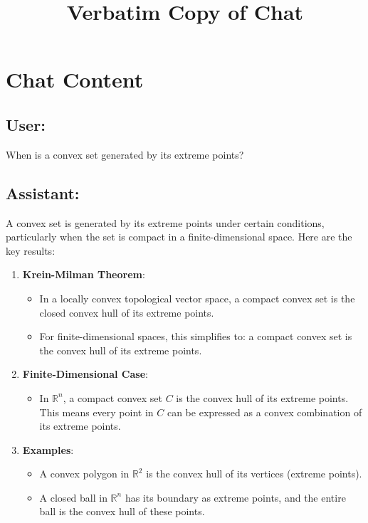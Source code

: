 \documentclass{article}
\begin{document}
\title{Verbatim Copy of Chat}
\author{}
\date{}
\maketitle

\section*{Chat Content}

\subsection*{User:}

When is a convex set generated by its extreme points?

\subsection*{Assistant:}

A convex set is generated by its extreme points under certain conditions,
particularly when the set is compact in a finite-dimensional space. Here are
the key results:

\begin{enumerate}
\item \textbf{Krein-Milman Theorem}: 

\begin{itemize}
\item In a locally convex topological vector space, a compact convex set is
the closed convex hull of its extreme points. 

\item For finite-dimensional spaces, this simplifies to: a compact convex
set is the convex hull of its extreme points. 
\end{itemize}

\item \textbf{Finite-Dimensional Case}: 

\begin{itemize}
\item In $\mathbb{R}^n$, a compact convex set $C$ is the convex hull of its
extreme points. This means every point in $C$ can be expressed as a convex
combination of its extreme points. 
\end{itemize}

\item \textbf{Examples}: 

\begin{itemize}
\item A convex polygon in $\mathbb{R}^2$ is the convex hull of its vertices
(extreme points). 

\item A closed ball in $\mathbb{R}^n$ has its boundary as extreme points,
and the entire ball is the convex hull of these points. 
\end{itemize}
\end{enumerate}
\end{document}
